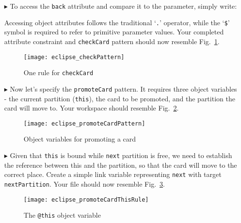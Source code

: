 \begin{itemize}
\item[$\blacktriangleright$] To access the \texttt{back} attribute and compare it to the parameter, simply write: 


Accessing object attributes follows the traditional `\texttt{.}' operator, while the `\texttt{\$}' symbol is required to refer to primitive parameter values.
Your completed attribute constraint and \texttt{checkCard} pattern should now resemble Fig.~\ref{fig:checkPattern}.

\begin{figure}[htbp]
\begin{center}
  \texttt{[image: eclipse\_checkPattern]}
  \caption{One rule for \texttt{checkCard}}
  \label{fig:checkPattern}
\end{center}
\end{figure} 

\clearpage

\item[$\blacktriangleright$] Now let's specify the \texttt{promoteCard} pattern. It requires three object variables - the current partition (\texttt{this}),
the card to be promoted, and the partition the card will move to. Your workspace should resemble Fig.~\ref{fig:promoteCardPattern}.

\begin{figure}[htbp]
\begin{center}
  \texttt{[image: eclipse\_promoteCardPattern]}
  \caption{Object variables for promoting a card}
  \label{fig:promoteCardPattern}
\end{center}
\end{figure} 

\item[$\blacktriangleright$] Given that \texttt{this} is bound while \texttt{next} partition is free, we need to establish the reference between this and the
partition, so that the card will move to the correct place. Create a simple link variable representing \texttt{next} with target \texttt{nextPartition}. Your
file should now resemble Fig.~\ref{fig:promoteThisRule}.

\vspace{0.5cm}

\begin{figure}[htbp]
\begin{center}
  \texttt{[image: eclipse\_promoteCardThisRule]}
  \caption{The \texttt{@this} object variable}
  \label{fig:promoteThisRule}
\end{center}
\end{figure} 


\end{itemize}
